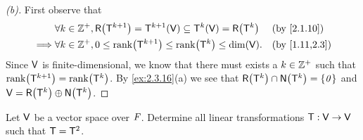 \begin{proof}[(b)]
  First observe that
  \begin{align*}
             & \forall k \in \Z^+, \rg{\T^{k + 1}} = \T^{k + 1}(\V) \subseteq \T^k(\V) = \rg{\T^k} &  & \by{2.1.10}   \\
    \implies & \forall k \in \Z^+, 0 \leq \rk{\T^{k + 1}} \leq \rk{\T^k} \leq \dim(\V).            &  & \by{1.11,2.3}
  \end{align*}
  Since \(\mathsf{V}\) is finite-dimensional, we know that there must exists a \(k \in \mathbb{Z}^+\) such that \(\rk{\T^{k + 1}} = \rk{\T^k}\).
  By \cref{ex:2.3.16}(a) we see that \(\rg{\T^k} \cap \ns{\T^k} = \set{\zv}\) and \(\V = \rg{\T^k} \oplus \ns{\T^k}\).
\end{proof}

\begin{ex}\label{ex:2.3.17}
  Let \(\mathsf{V}\) be a vector space over \(\mathit{F}\).
  Determine all linear transformations \(\mathsf{T} : \mathsf{V} \to \mathsf{V}\) such that \(\mathsf{T} = \mathsf{T}^2\).
\end{ex}

